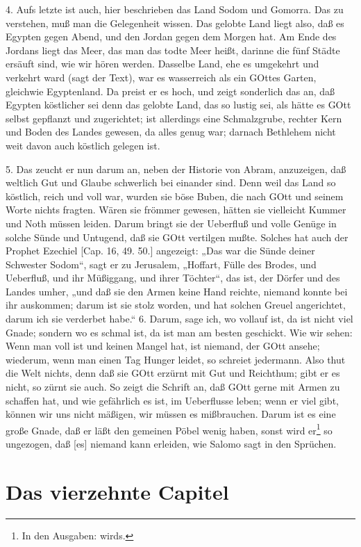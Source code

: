 4. Aufs letzte ist auch, hier beschrieben das Land Sodom und Gomorra. Das zu verstehen, muß man die Gelegenheit wissen. Das gelobte Land liegt also, daß es Egypten gegen Abend, und den Jordan gegen dem Morgen hat. Am Ende des Jordans liegt das Meer, das man das todte Meer heißt, darinne die fünf Städte ersäuft sind, wie wir hören werden. Dasselbe Land, ehe es umgekehrt und verkehrt ward (sagt der Text), war es wasserreich als ein GOttes Garten, gleichwie Egyptenland. Da preist er es hoch, und zeigt sonderlich das an, daß Egypten köstlicher sei denn das gelobte Land, das so lustig sei, als hätte es GOtt selbst gepflanzt und zugerichtet; ist allerdings eine Schmalzgrube, rechter Kern und Boden des Landes gewesen, da alles genug war; darnach Bethlehem nicht weit davon auch köstlich gelegen ist.

5. Das zeucht er nun darum an, neben der Historie von Abram, anzuzeigen, daß weltlich Gut und Glaube schwerlich bei einander sind. Denn weil das Land so köstlich, reich und voll war, wurden sie böse Buben, die nach GOtt und seinem Worte nichts fragten. Wären sie frömmer gewesen, hätten sie vielleicht Kummer und Noth müssen leiden. Darum bringt sie der Ueberfluß und volle Genüge in solche Sünde und Untugend, daß sie GOtt vertilgen mußte. Solches hat auch der Prophet Ezechiel [Cap. 16, 49. 50.] angezeigt: „Das war die Sünde deiner Schwester Sodom“, sagt er zu Jerusalem, „Hoffart, Fülle des Brodes, und Ueberfluß, und ihr Müßiggang, und ihrer Töchter“, das
ist, der Dörfer und des Landes umher, „und daß sie den Armen keine Hand reichte, niemand konnte bei ihr auskommen; darum ist sie stolz worden, und hat solchen Greuel angerichtet, darum ich sie verderbet habe.“ 6. Darum, sage ich, wo vollauf ist, da ist nicht viel Gnade; sondern wo es schmal ist, da ist man am besten geschickt. Wie wir sehen: Wenn man voll ist und keinen Mangel hat, ist niemand, der GOtt ansehe; wiederum, wenn man einen Tag Hunger leidet, so schreiet jedermann. Also thut die Welt nichts, denn daß sie GOtt erzürnt mit Gut und Reichthum; gibt er es nicht, so zürnt sie auch. So zeigt die Schrift an, daß GOtt gerne mit Armen zu schaffen hat, und wie gefährlich es ist, im Ueberflusse leben; wenn er viel gibt, können wir uns nicht mäßigen, wir müssen es mißbrauchen. Darum ist es eine große Gnade, daß er läßt den gemeinen Pöbel wenig haben, sonst wird er\footnote{In den Ausgaben: wirds.} so ungezogen, daß [es] niemand kann erleiden, wie Salomo sagt in den Sprüchen.

\section{Das vierzehnte Capitel}

